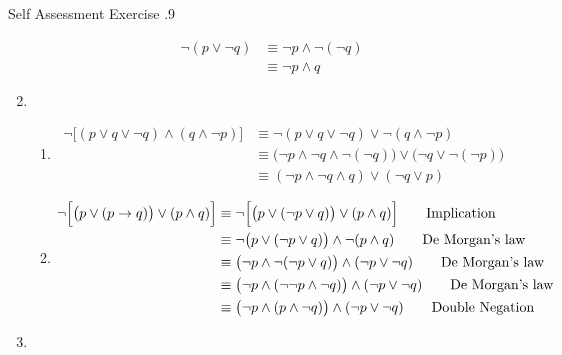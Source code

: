 \documentclass[\main/notes.tex]{subfiles}
\begin{document}
\begin{exercise}{Self Assessment Exercise \thechapter.9}
\begin{enumerate}
						\begin{align*}
							\lnot (p \lor \lnot q) &\equiv \lnot p \land \lnot (\lnot q) \tag*{De Morgan's law}\\
							&\equiv \lnot p \land q \tag*{Double Negation}
						\end{align*}
					\item {}
						\begin{enumerate}[label=(\alph*)]
							\item {}
								\begin{align*}
									\lnot \bigl[(p \lor q \lor \lnot q) \land (q \land \lnot p)\bigr] &\equiv \lnot(p \lor q \lor \lnot q) \lor \lnot(q \land \lnot p) \tag*{De Morgan's law}\\
									& \equiv \bigl(\lnot p \land \lnot q \land \lnot (\lnot q)\bigr) \lor \bigl(\lnot q \lor \lnot (\lnot p)\bigr) \tag*{De Morgan's law}\\
									& \equiv (\lnot p \land \lnot q \land q) \lor (\lnot q \lor p) \tag*{Double Negation}
								\end{align*}
							\item {}
								\begin{align*}
									\lnot \Bigl[\bigl(p \lor (p \rightarrow q)\bigr) \lor (p \land q)\Bigr] &\equiv \lnot \Bigl[\bigl(p \lor (\lnot p \lor q)\bigr) \lor (p \land q)\Bigr] \tag*{Implication}\\
									& \equiv \lnot \bigl(p \lor (\lnot p \lor q)\bigr) \land \lnot (p \land q) \tag*{De Morgan's law}\\
									& \equiv \bigl(\lnot p \land \lnot (\lnot p \lor q)\bigr) \land (\lnot p \lor \lnot q) \tag*{De Morgan's law}\\
									& \equiv \bigl(\lnot p \land (\lnot \lnot p \land \lnot q)\bigr) \land (\lnot p \lor \lnot q) \tag*{De Morgan's law}\\
									& \equiv \bigl(\lnot p \land (p \land \lnot q)\bigr) \land (\lnot p \lor \lnot q) \tag*{Double Negation}
								\end{align*}
						\end{enumerate}
					\item {}

\end{enumerate}
\end{exercise}
\end{document}

